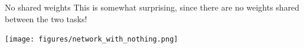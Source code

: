 \documentclass{beamer}
\begin{document}
\begin{frame}{No shared weights}
This is somewhat surprising, since there are no weights shared between the two tasks!\vspace{10pt}
\begin{overlayarea}{\textwidth}{0.35\textheight}
\texttt{[image: figures/network\_with\_nothing.png]}
\end{overlayarea}
\end{frame}

\end{document}

